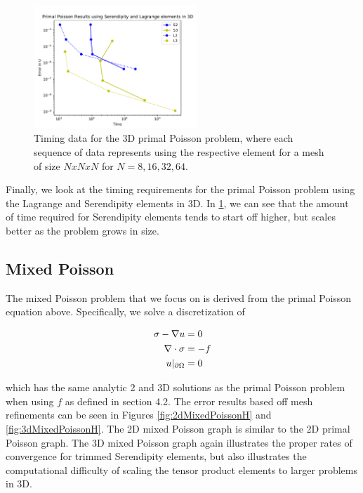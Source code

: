 \documentclass[manuscript,screen]{acmart}
\begin{document}
  \begin{figure}[h]
    \includegraphics[width=0.55\textwidth]{3dPrimalTime.pdf}
    \caption{Timing data for the 3D primal Poisson problem, where each sequence of data represents using the respective element for a mesh of size $N x N x N$ for $N = 8, 16, 32, 64$.}
    \label{fig:3dPrimalTime}
  \end{figure}
\newpage 

\noindent Finally, we look at the timing requirements for the primal Poisson problem using the Lagrange and Serendipity elements in 3D.  In \ref{fig:3dPrimalTime}, we can see that the amount of time required for Serendipity elements tends to start off higher, but scales better as the problem grows in size.  


\newpage
\subsection{Mixed Poisson}

  
The mixed Poisson problem that we focus on is derived from the primal Poisson equation above.  Specifically, we solve a discretization of 

\begin{align}
     \sigma - \nabla u &= 0 \\
     \nabla \cdot \sigma &= -f \notag \\
     u\vert_{\partial \Omega} &= 0 \notag
\end{align}

 

\noindent which has the same analytic 2 and 3D solutions as the primal Poisson problem when using $f$ as defined in section 4.2.  The error results based off mesh refinements can be seen in Figures \ref{fig:2dMixedPoissonH} and \ref{fig:3dMixedPoissonH}.  The 2D mixed Poisson graph is similar to the 2D primal Poisson graph.  The 3D mixed Poisson graph again illustrates the proper rates of convergence for trimmed Serendipity elements, but also illustrates the computational difficulty of scaling the tensor product elements to larger problems in 3D.
\end{document}
